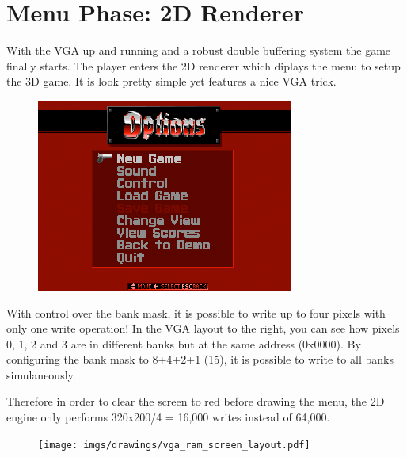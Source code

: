 \section{Menu Phase: 2D Renderer}
With the VGA up and running and a robust double buffering system the game finally starts. The player enters the 2D renderer which diplays the menu to setup the 3D game. It is look pretty simple yet features a nice VGA trick.
\par
\begin{figure}[H]
\centering
\includegraphics[width=\textwidth]{screenshots/first_menu.png}
\end{figure}
\par


\begin{minipage}{.55\textwidth}
With control over the bank mask, it is possible to write up to four pixels with only one write operation! In the VGA layout to the right, you can see how pixels 0, 1, 2 and 3 are in different banks but at the same address (0x0000). By configuring the bank mask to 8+4+2+1 (15), it is possible to write to all banks simulaneously.\\
\par
Therefore in order to clear the screen to red before drawing the menu, the 2D engine only performs 320x200/4 = 16,000 writes instead of 64,000.\\
\par
\end{minipage}
\begin{minipage}{.4\textwidth}
\begin{figure}[H]
\centering
\texttt{[image: imgs/drawings/vga\_ram\_screen\_layout.pdf]}
\end{figure}
\end{minipage}

